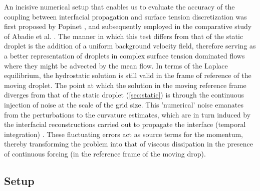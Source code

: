 An incisive numerical setup that enables us to evaluate the accuracy of the coupling between interfacial propagation and surface tension discretization was first proposed by Popinet \cite{popinet2009accurate}, and subsequently employed in the comparative study of Abadie et al. . The manner in which this test differs from that of the static droplet is the addition of a uniform background velocity field, therefore serving as a better representation of droplets in complex surface tension dominated flows where they might be advected by the mean flow. In terms of the Laplace equilibrium, the hydrostatic solution is still valid in the frame of reference of the moving droplet. The point at which the solution in the moving reference frame diverges from that of the static droplet (\ref{sec:static}) is through the continuous injection of noise at the scale of the grid size. This 'numerical' noise emanates from the perturbations to the curvature estimates, which are in turn induced by the interfacial reconstructions carried out to propagate the interface (temporal integration) . These fluctuating errors act as source terms for the momentum, thereby transforming the problem into that of viscous dissipation in the presence of continuous forcing (in the reference frame of the moving drop).

\subsection*{Setup}

